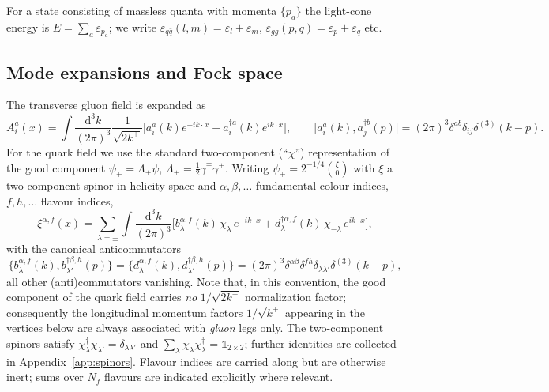 \documentclass[11pt]{article}
\newcommand{\eps}{\varepsilon}
\newcommand{\dd}{\mathrm{d}}
\newcommand{\ip}[1]{\int\!\frac{\dd^3 #1}{(2\pi)^3}}
\newcommand{\dg}{\dagger}
\newcommand{\dthree}{\delta^{(3)}}
\begin{document}
For a state consisting of massless quanta with momenta $\{p_a\}$ the light-cone energy is
$E=\sum_a\eps_{p_a}$; we write $\eps_{q\bar q}(l,m)=\eps_l+\eps_m$, $\eps_{gg}(p,q)=\eps_p+\eps_q$
etc.

\subsection{Mode expansions and Fock space}

The transverse gluon field is expanded as
\begin{equation}
A^a_i(x)=\ip{k}\frac{1}{\sqrt{2k^+}}\Big[a^a_i(k)e^{-ik\cdot x}+a^{\dg a}_i(k)e^{ik\cdot x}\Big],
\qquad
\big[a^a_i(k),a^{\dg b}_j(p)\big]=(2\pi)^3\delta^{ab}\delta_{ij}\dthree(k-p).
\label{eq:Aexp}
\end{equation}
For the quark field we use the standard two-component (``$\chi$'') representation of the good
component $\psi_+=\Lambda_+\psi$, $\Lambda_\pm=\tfrac12\gamma^\mp\gamma^\pm$. Writing
$\psi_+=2^{-1/4}\binom{\xi}{0}$ with $\xi$ a two-component spinor in helicity space and
$\alpha,\beta,\dots$ fundamental colour indices, $f,h,\dots$ flavour indices,
\begin{equation}
\xi^{\alpha,f}(x)=\sum_{\lambda=\pm}\ip{k}
\Big[b^{\alpha,f}_\lambda(k)\,\chi_\lambda\,e^{-ik\cdot x}
+d^{\dg\alpha,f}_\lambda(k)\,\chi_{-\lambda}\,e^{ik\cdot x}\Big],
\label{eq:psiexp}
\end{equation}
with the canonical anticommutators
\begin{equation}
\big\{b^{\alpha,f}_\lambda(k),b^{\dg\beta,h}_{\lambda'}(p)\big\}
=\big\{d^{\alpha,f}_\lambda(k),d^{\dg\beta,h}_{\lambda'}(p)\big\}
=(2\pi)^3\delta^{\alpha\beta}\delta^{fh}\delta_{\lambda\lambda'}\dthree(k-p),
\end{equation}
all other (anti)commutators vanishing. Note that, in this convention, the good component of the
quark field carries {\em no} $1/\sqrt{2k^+}$ normalization factor; consequently the longitudinal
momentum factors $1/\sqrt{k^+}$ appearing in the vertices below are always associated with
{\em gluon} legs only. The two-component spinors satisfy
$\chi^\dg_\lambda\chi_{\lambda'}=\delta_{\lambda\lambda'}$ and
$\sum_\lambda\chi_\lambda\chi^\dg_\lambda=\mathbb{1}_{2\times2}$; further identities are collected
in Appendix~\ref{app:spinors}. Flavour indices are carried along but are otherwise inert; sums over
$N_f$ flavours are indicated explicitly where relevant.
\end{document}
